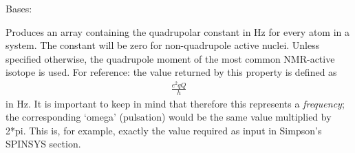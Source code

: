 \documentclass[letterpaper,10pt,english]{sphinxmanual}
\begin{document}
\begin{fulllineitems}
\label{doctree/soprano.properties.nmr.efg:soprano.properties.nmr.efg.EFGQuadrupolarConstant}
Bases: {\hyperref[doctree/soprano.properties.atomsproperty:soprano.properties.atomsproperty.AtomsProperty]{}}

Produces an array containing the quadrupolar constant in Hz for every atom
in a system. The constant will be zero for non-quadrupole active nuclei.
Unless specified otherwise, the quadrupole moment of the most common
NMR-active isotope is used.
For reference: the value returned by this property is defined as
\begin{equation*}
\begin{split}\frac{e^2qQ}{h}\end{split}
\end{equation*}
in Hz. It is important to keep in mind that therefore this represents a
\emph{frequency}; the corresponding `omega' (pulsation) would be the same value
multiplied by 2*pi. This is, for example, exactly the value required as
input in Simpson's SPINSYS section.


\end{fulllineitems}
\end{document}
